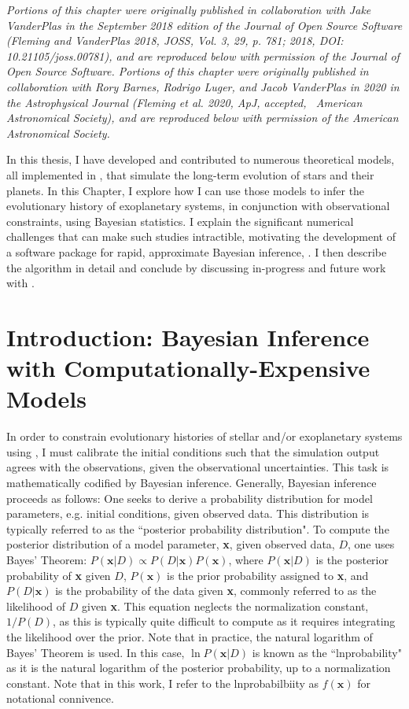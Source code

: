 \textit{Portions of this chapter were originally published in collaboration with Jake VanderPlas in the September 2018 edition of the Journal of Open Source Software (Fleming and VanderPlas 2018, JOSS, Vol. 3, 29, p. 781; 2018, DOI: 10.21105/joss.00781), and are reproduced below with permission of the Journal of Open Source Software. Portions of this chapter were originally published in collaboration with Rory Barnes, Rodrigo Luger, and Jacob VanderPlas in 2020 in the Astrophysical Journal (Fleming et al. 2020, ApJ, accepted, \textcopyright \ American Astronomical Society), and are reproduced below with permission of the American Astronomical Society.}

In this thesis, I have developed and contributed to numerous theoretical models, all implemented in \vplanet, that simulate the long-term evolution of stars and their planets. In this Chapter, I explore how I can use those models to infer the evolutionary history of exoplanetary systems, in conjunction with observational constraints, using Bayesian statistics. I explain the significant numerical challenges that can make such studies intractible, motivating the development of a software package for rapid, approximate Bayesian inference, \approxposterior. I then describe the \approxposterior algorithm in detail and conclude by discussing in-progress and future work with \approxposterior. 

\section{Introduction: Bayesian Inference with Computationally-Expensive Models}

In order to constrain evolutionary histories of stellar and/or exoplanetary systems using \vplanet, I must calibrate the initial conditions such that the simulation output agrees with the observations, given the observational uncertainties.  This task is mathematically codified by Bayesian inference. Generally, Bayesian inference proceeds as follows:  One seeks to derive a probability distribution for model parameters, e.g. \vplanet initial conditions, given observed data. This distribution is typically referred to as the ``posterior probability distribution". To compute the posterior distribution of a model parameter, \textbf{x}, given observed data, $D$, one uses Bayes' Theorem: $P(\textbf{x} | D) \propto P(D | \textbf{x}) P(\textbf{x})$, where $P(\textbf{x} | D)$ is the posterior probability of \textbf{x} given $D$, $P(\textbf{x})$ is the prior probability assigned to \textbf{x}, and $P(D | \textbf{x})$ is the probability of the data given \textbf{x}, commonly referred to as the likelihood of $D$ given \textbf{x}. This equation neglects the normalization constant, $1/P(D)$, as this is typically quite difficult to compute as it requires integrating the likelihood over the prior. Note that in practice, the natural logarithm of Bayes' Theorem is used. In this case, $\ln P(\textbf{x} | D)$ is known as the ``lnprobability" as it is the natural logarithm of the posterior probability, up to a normalization constant. Note that in this work, I refer to the lnprobabilbiity as $f(\textbf{x})$ for notational connivence. 

